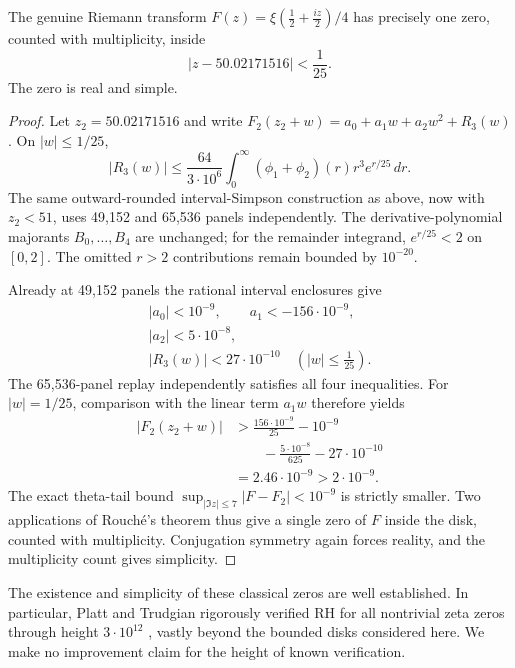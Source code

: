 \begin{theorem}
\label{thm:thirdzerodisk}
The genuine Riemann transform
$F(z)=\xi(\tfrac12+\tfrac{iz}{2})/4$
has precisely one zero, counted
with multiplicity, inside
\[
\boxed{|z-50.02171516|<\frac1{25}.}
\]
The zero is real and simple.
\end{theorem}
\begin{proof}
Let $z_2=50.02171516$ and write
$F_2(z_2+w)=a_0+a_1w+a_2w^2+R_3(w)$.
On $|w|\le1/25$,
\[
|R_3(w)|\le
\frac{64}{3\cdot10^6}
\int_0^\infty
(\phi_1+\phi_2)(r)
r^3e^{r/25}\,dr.
\]
The same outward-rounded
interval-Simpson construction
as above, now with $z_2<51$,
uses 49,152 and 65,536
panels independently.
The derivative-polynomial
majorants $B_0,\ldots,B_4$
are unchanged; for the remainder
integrand, $e^{r/25}<2$ on
$[0,2]$. The omitted
$r>2$ contributions remain
bounded by $10^{-20}$.

Already at 49,152 panels
the rational interval enclosures
give
\begin{equation}\label{eq:thirdTaylor}
\boxed{\begin{gathered}
|a_0|<10^{-9},\qquad
a_1<-156\cdot10^{-9},\\
|a_2|<5\cdot10^{-8},\\
|R_3(w)|<27\cdot10^{-10}
\quad(|w|\le\tfrac1{25}).
\end{gathered}}
\end{equation}
The 65,536-panel replay
independently satisfies
all four inequalities.
For $|w|=1/25$,
comparison with the linear
term $a_1w$ therefore yields
\begin{align*}
|F_2(z_2+w)|
&>\frac{156\cdot10^{-9}}{25}
-10^{-9}\\
&\qquad-\frac{5\cdot10^{-8}}{625}
-27\cdot10^{-10}\\
&=2.46\cdot10^{-9}
>2\cdot10^{-9}.
\end{align*}
The exact theta-tail bound
$\sup_{|\Im z|\le7}|F-F_2|<10^{-9}$
is strictly smaller.
Two applications of
Rouch\'e's theorem thus give
a single zero of $F$
inside the disk, counted
with multiplicity.
Conjugation symmetry again
forces reality, and the
multiplicity count gives
simplicity.
\end{proof}

The existence and simplicity
of these classical zeros are
well established. In particular,
Platt and Trudgian rigorously
verified RH for all nontrivial
zeta zeros through height
$3\cdot10^{12}$ \cite{PlattTrudgian},
vastly beyond the bounded disks
considered here. We make no
improvement claim for the
height of known verification.

